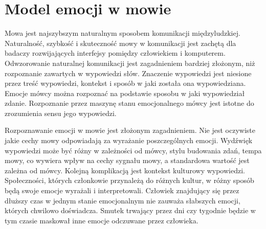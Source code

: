 \documentclass[a4paper,12pt,twoside,openany]{report}
\begin{document}
\section{Model emocji w mowie}
Mowa jest najszybszym naturalnym sposobem komunikacji międzyludzkiej.
Naturalność, szybkość i skuteczność mowy w komunikacji jest zachętą dla badaczy rozwijających interfejsy pomiędzy człowiekiem i komputerem. 
Odwzorowanie naturalnej komunikacji jest zagadnieniem bardziej złożonym, niż rozpoznanie zawartych w wypowiedzi słów.
Znaczenie wypowiedzi jest niesione przez treść wypowiedzi, kontekst i sposób w jaki została ona wypowiedziana.
Emocje mówcy można rozpoznać na podstawie sposobu w jaki wypowiedział zdanie.
Rozpoznanie przez maszynę stanu emocjonalnego mówcy jest istotne do zrozumienia sensu jego wypowiedzi.

Rozpoznawanie emocji w mowie jest złożonym zagadnieniem.
Nie jest oczywiste jakie cechy mowy odpowiadają za wyrażanie poszczególnych emocji.
Wydźwięk wypowiedzi może być różny w zależności od mówcy, stylu budowania zdań, tempa mowy, co wywiera wpływ na cechy sygnału mowy, a standardowa wartość jest zależna od mówcy.
Kolejną komplikacją jest kontekst kulturowy wypowiedzi. 
Społeczności, których członkowie przynależą do różnych kultur, w różny sposób będą swoje emocje wyrażali i interpretowali.
Człowiek znajdujący się przez dłuższy czas w jednym stanie emocjonalnym nie zauważa słabszych emocji, których chwilowo doświadcza.
Smutek trwający przez dni czy tygodnie będzie w tym czasie maskował inne emocje odczuwane przez człowieka.
\end{document}
